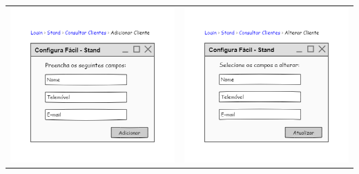 \documentclass[11pt]{article} %
\begin{document}
\begin{center}
	\begin{table}[]
		\begin{tabular}{cc}
 			\includegraphics[width = 3in]{adicionar_cliente.png}	& \includegraphics[width = 3in]{alterar_cliente.png}
		\end{tabular}
	\end{table}
 	 	
\end{center}
\end{document}

